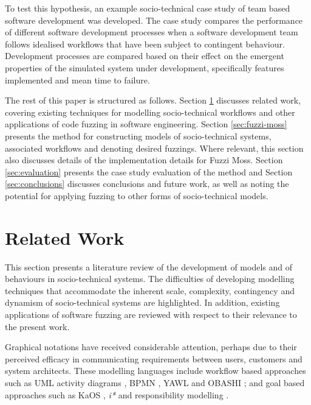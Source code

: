 \documentclass{sig-alternate}
\begin{document}
To test this hypothesis, an example socio-technical case study of team based software development was developed.  The
case study compares the performance of different software development processes when a software development team follows
idealised workflows that have been subject to contingent behaviour.  Development processes are compared based on their
effect on the emergent properties of the simulated system under development, specifically features implemented and mean
time to failure.

The rest of this paper is structured as follows.  Section \ref{sec:related} discusses related work, covering existing
techniques for modelling socio-technical workflows and other applications of code fuzzing in software engineering.
Section \ref{sec:fuzzi-moss} presents the method for constructing models of socio-technical systems, associated
workflows and denoting desired fuzzings.  Where relevant, this section also discusses details of the implementation
details for Fuzzi Moss.  Section \ref{sec:evaluation} presents the case study evaluation of the method and Section
\ref{sec:conclusions} discusses conclusions and future work, as well as noting the potential for applying fuzzing to
other forms of socio-technical models.


\section{Related Work}

\label{sec:related}


This section presents a literature review of the development of models and of behaviours in socio-technical systems.
The difficulties of developing modelling techniques that accommodate the inherent scale, complexity, contingency and
dynamism of socio-technical systems are highlighted.  In addition, existing applications of software fuzzing are
reviewed with respect to their relevance to the present work.

Graphical notations have received considerable attention, perhaps due to their perceived efficacy in communicating
requirements between users, customers and system architects.  These modelling languages include workflow based
approaches such as UML activity diagrams \citep{omg2010omguml}, BPMN \citep{omg2011omgbpmn}, YAWL
\citep{hofstede2010yawl} and OBASHI \cite{obashimethodology}; and goal based approaches such as KaOS
\citep{Werneck2009}, \emph{i*} \citep{yu1995} and responsibility modelling \citep{sommerville09responsibility}.
\end{document}
